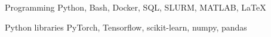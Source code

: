 

\begin{cvskills}

  \cvskill
    {Programming} %
    {Python, Bash, Docker, SQL, SLURM, MATLAB, LaTeX} %

  \cvskill
    {Python libraries} %
    {PyTorch, Tensorflow, scikit-learn, numpy, pandas} %

\end{cvskills}

\clearpage
